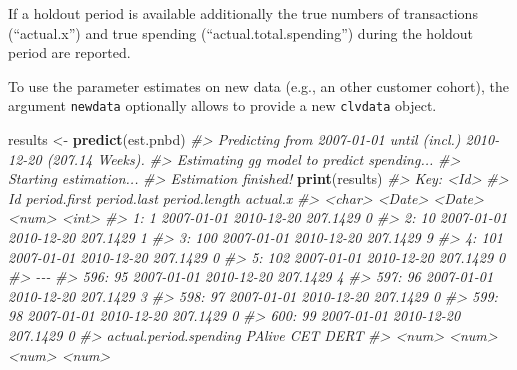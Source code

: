 \documentclass[
]{article}
\newenvironment{Shaded}{\begin{snugshade}}{\end{snugshade}}
\newcommand{\CommentTok}[1]{\textcolor[rgb]{0.56,0.35,0.01}{\textit{#1}}}
\newcommand{\FunctionTok}[1]{\textcolor[rgb]{0.13,0.29,0.53}{\textbf{#1}}}
\newcommand{\NormalTok}[1]{#1}
\newcommand{\OtherTok}[1]{\textcolor[rgb]{0.56,0.35,0.01}{#1}}
\begin{document}
If a holdout period is available additionally the true numbers of
transactions (``actual.x'') and true spending
(``actual.total.spending'') during the holdout period are reported.

To use the parameter estimates on new data (e.g., an other customer
cohort), the argument \texttt{newdata} optionally allows to provide a
new \texttt{clvdata} object.

\begin{Shaded}
\begin{Highlighting}[]
\NormalTok{results }\OtherTok{\textless{}{-}} \FunctionTok{predict}\NormalTok{(est.pnbd)}
\CommentTok{\#\textgreater{} Predicting from 2007{-}01{-}01 until (incl.) 2010{-}12{-}20 (207.14 Weeks).}
\CommentTok{\#\textgreater{} Estimating gg model to predict spending...}
\CommentTok{\#\textgreater{} Starting estimation...}
\CommentTok{\#\textgreater{} Estimation finished!}
\FunctionTok{print}\NormalTok{(results)}
\CommentTok{\#\textgreater{} Key: \textless{}Id\textgreater{}}
\CommentTok{\#\textgreater{}          Id period.first period.last period.length actual.x}
\CommentTok{\#\textgreater{}      \textless{}char\textgreater{}       \textless{}Date\textgreater{}      \textless{}Date\textgreater{}         \textless{}num\textgreater{}    \textless{}int\textgreater{}}
\CommentTok{\#\textgreater{}   1:      1   2007{-}01{-}01  2010{-}12{-}20      207.1429        0}
\CommentTok{\#\textgreater{}   2:     10   2007{-}01{-}01  2010{-}12{-}20      207.1429        1}
\CommentTok{\#\textgreater{}   3:    100   2007{-}01{-}01  2010{-}12{-}20      207.1429        9}
\CommentTok{\#\textgreater{}   4:    101   2007{-}01{-}01  2010{-}12{-}20      207.1429        0}
\CommentTok{\#\textgreater{}   5:    102   2007{-}01{-}01  2010{-}12{-}20      207.1429        0}
\CommentTok{\#\textgreater{}  {-}{-}{-}                                                       }
\CommentTok{\#\textgreater{} 596:     95   2007{-}01{-}01  2010{-}12{-}20      207.1429        4}
\CommentTok{\#\textgreater{} 597:     96   2007{-}01{-}01  2010{-}12{-}20      207.1429        3}
\CommentTok{\#\textgreater{} 598:     97   2007{-}01{-}01  2010{-}12{-}20      207.1429        0}
\CommentTok{\#\textgreater{} 599:     98   2007{-}01{-}01  2010{-}12{-}20      207.1429        0}
\CommentTok{\#\textgreater{} 600:     99   2007{-}01{-}01  2010{-}12{-}20      207.1429        0}
\CommentTok{\#\textgreater{}      actual.period.spending    PAlive       CET       DERT}
\CommentTok{\#\textgreater{}                       \textless{}num\textgreater{}     \textless{}num\textgreater{}     \textless{}num\textgreater{}      \textless{}num\textgreater{}}

\end{Highlighting}
\end{Shaded}
\end{document}
